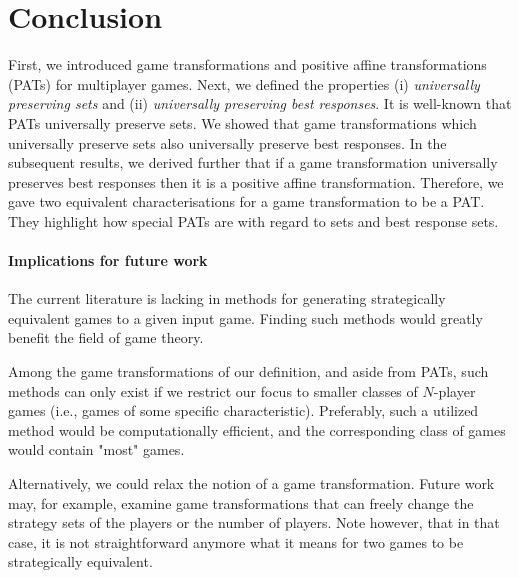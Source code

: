 


\section{Conclusion}
First, we introduced game transformations and positive affine transformations (PATs) for multiplayer games. Next, we defined the properties (i) \textit{universally preserving \NE{} sets} and (ii) \textit{universally preserving best responses}. It is well-known that PATs universally preserve \NE{} sets. We showed that game transformations which universally preserve \NE{} sets also universally preserve  best responses. In the subsequent results, we derived further that if a game transformation universally preserves best responses then it is a positive affine transformation. Therefore, we gave two equivalent characterisations for a game transformation to be a PAT. They highlight how special PATs are with regard to \NE{} sets and best response sets.

\paragraph{Implications for future work}
The current literature is lacking in methods for generating strategically equivalent games to a given input game. Finding such methods would greatly benefit the field of game theory. 

Among the game transformations of our definition, and aside from PATs, such methods can only exist if we restrict our focus to smaller classes of $N$-player games (i.e., games of some specific characteristic). Preferably, such a utilized method would be computationally efficient, and the corresponding class of games would contain "most" games. 

Alternatively, we could relax the notion of a game transformation. Future work may, for example, examine game transformations that can freely change the strategy sets of the players or the number of players. Note however, that in that case, it is not straightforward anymore what it means for two games to be strategically equivalent.

